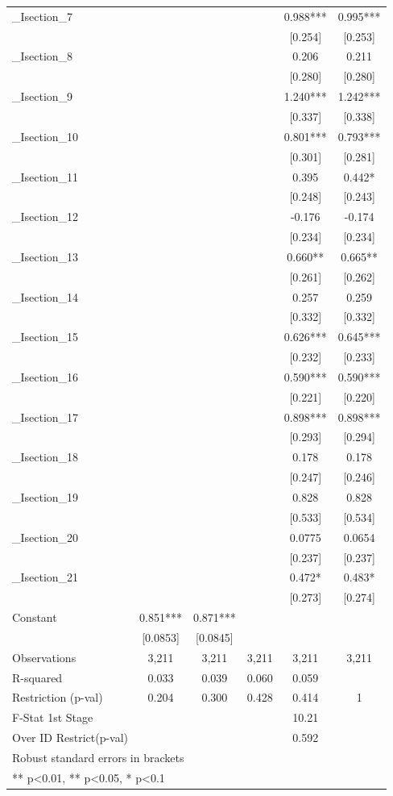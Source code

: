 \begin{tabular}{lccccc}
\_Isection\_7 &  &  &  & 0.988*** & 0.995*** \\
 &  &  &  & [0.254] & [0.253] \\
\_Isection\_8 &  &  &  & 0.206 & 0.211 \\
 &  &  &  & [0.280] & [0.280] \\
\_Isection\_9 &  &  &  & 1.240*** & 1.242*** \\
 &  &  &  & [0.337] & [0.338] \\
\_Isection\_10 &  &  &  & 0.801*** & 0.793*** \\
 &  &  &  & [0.301] & [0.281] \\
\_Isection\_11 &  &  &  & 0.395 & 0.442* \\
 &  &  &  & [0.248] & [0.243] \\
\_Isection\_12 &  &  &  & -0.176 & -0.174 \\
 &  &  &  & [0.234] & [0.234] \\
\_Isection\_13 &  &  &  & 0.660** & 0.665** \\
 &  &  &  & [0.261] & [0.262] \\
\_Isection\_14 &  &  &  & 0.257 & 0.259 \\
 &  &  &  & [0.332] & [0.332] \\
\_Isection\_15 &  &  &  & 0.626*** & 0.645*** \\
 &  &  &  & [0.232] & [0.233] \\
\_Isection\_16 &  &  &  & 0.590*** & 0.590*** \\
 &  &  &  & [0.221] & [0.220] \\
\_Isection\_17 &  &  &  & 0.898*** & 0.898*** \\
 &  &  &  & [0.293] & [0.294] \\
\_Isection\_18 &  &  &  & 0.178 & 0.178 \\
 &  &  &  & [0.247] & [0.246] \\
\_Isection\_19 &  &  &  & 0.828 & 0.828 \\
 &  &  &  & [0.533] & [0.534] \\
\_Isection\_20 &  &  &  & 0.0775 & 0.0654 \\
 &  &  &  & [0.237] & [0.237] \\
\_Isection\_21 &  &  &  & 0.472* & 0.483* \\
 &  &  &  & [0.273] & [0.274] \\
Constant & 0.851*** & 0.871*** &  &  &  \\
 & [0.0853] & [0.0845] &  &  &  \\
\midrule
Observations & 3,211 & 3,211 & 3,211 & 3,211 & 3,211 \\
R-squared & 0.033 & 0.039 & 0.060 & 0.059 &  \\
Restriction (p-val) & 0.204 & 0.300 & 0.428 & 0.414 & 1 \\
F-Stat 1st Stage &  &  &  & 10.21 &  \\
Over ID Restrict(p-val) &  &  &  & 0.592 &  \\
\bottomrule
\multicolumn{6}{l}{\footnotesize Robust standard errors in brackets} \\
\multicolumn{6}{l}{\footnotesize *** p<0.01, ** p<0.05, * p<0.1} \\
\end{tabular}

